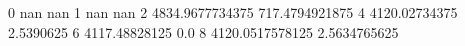 0 nan nan
1 nan nan
2 4834.9677734375 717.4794921875
4 4120.02734375 2.5390625
6 4117.48828125 0.0
8 4120.0517578125 2.5634765625
